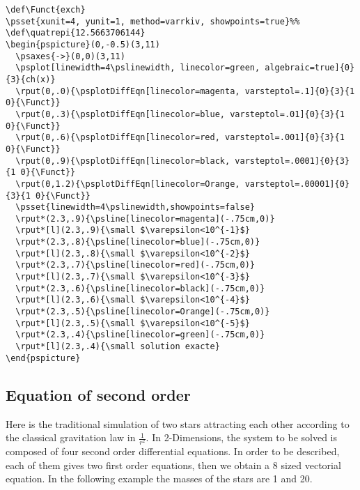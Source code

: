 \documentclass[11pt,english,BCOR10mm,DIV12,bibliography=totoc,parskip=false,smallheadings
    headexclude,footexclude,oneside]{pst-doc}
\begin{document}
\begin{lstlisting}[wide=true]
\def\Funct{exch}
\psset{xunit=4, yunit=1, method=varrkiv, showpoints=true}%%
\def\quatrepi{12.5663706144}
\begin{pspicture}(0,-0.5)(3,11)
  \psaxes{->}(0,0)(3,11)
  \psplot[linewidth=4\pslinewidth, linecolor=green, algebraic=true]{0}{3}{ch(x)}
  \rput(0,.0){\psplotDiffEqn[linecolor=magenta, varsteptol=.1]{0}{3}{1 0}{\Funct}}
  \rput(0,.3){\psplotDiffEqn[linecolor=blue, varsteptol=.01]{0}{3}{1 0}{\Funct}}
  \rput(0,.6){\psplotDiffEqn[linecolor=red, varsteptol=.001]{0}{3}{1 0}{\Funct}}
  \rput(0,.9){\psplotDiffEqn[linecolor=black, varsteptol=.0001]{0}{3}{1 0}{\Funct}}
  \rput(0,1.2){\psplotDiffEqn[linecolor=Orange, varsteptol=.00001]{0}{3}{1 0}{\Funct}}
  \psset{linewidth=4\pslinewidth,showpoints=false}
  \rput*(2.3,.9){\psline[linecolor=magenta](-.75cm,0)}
  \rput*[l](2.3,.9){\small $\varepsilon<10^{-1}$}
  \rput*(2.3,.8){\psline[linecolor=blue](-.75cm,0)}
  \rput*[l](2.3,.8){\small $\varepsilon<10^{-2}$}
  \rput*(2.3,.7){\psline[linecolor=red](-.75cm,0)}
  \rput*[l](2.3,.7){\small $\varepsilon<10^{-3}$}
  \rput*(2.3,.6){\psline[linecolor=black](-.75cm,0)}
  \rput*[l](2.3,.6){\small $\varepsilon<10^{-4}$}
  \rput*(2.3,.5){\psline[linecolor=Orange](-.75cm,0)}
  \rput*[l](2.3,.5){\small $\varepsilon<10^{-5}$}
  \rput*(2.3,.4){\psline[linecolor=green](-.75cm,0)}
  \rput*[l](2.3,.4){\small solution exacte}
\end{pspicture}
\end{lstlisting}




\clearpage
\subsection{Equation of second order}

Here is the traditional simulation of two stars attracting each
other according to the classical gravitation law in
$\displaystyle\frac{1}{r^2}$. In 2-Dimensions, the system to be
solved is composed of four second order differential equations. In
order to be described, each of them gives two first order
equations, then we obtain a 8 sized vectorial equation. In the
following example the masses of the stars are 1 and 20.
\end{document}

